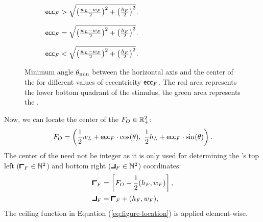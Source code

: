 \begin{figure}[!htp]
    \centering
    \begin{subfigure}[t]{0.3\textwidth}
        \centering
        
        \vspace{-1em}
        \caption{$\mathsf{ecc}_F > \sqrt{ \left( \frac{w_L - {w_F}}{2} \right)^2 + \left( \frac{{h_F}}{2} \right)^2 }$.}
        \label{fig:figangles-min1}
    \end{subfigure}
    \hspace{0.03\textwidth}
    \begin{subfigure}[t]{0.3\textwidth}
        \centering
        
        \vspace{-1em}
        \caption{$\mathsf{ecc}_F = \sqrt{ \left( \frac{w_L - {w_F}}{2} \right)^2 + \left( \frac{{h_F}}{2} \right)^2 }$.}
        \label{fig:figangles-min2}
    \end{subfigure}
    \hspace{0.03\textwidth}
    \begin{subfigure}[t]{0.3\textwidth}
        \centering
        
        \vspace{-1em}
        \caption{$\mathsf{ecc}_F < \sqrt{ \left( \frac{w_L - {w_F}}{2} \right)^2 + \left( \frac{{h_F}}{2} \right)^2 }$.}
        \label{fig:figangles-min3}
    \end{subfigure}
    \caption[Figure angle and eccentricity]{Minimum angle $\theta_{\min}$ between the horizontal axis and the center of the \stimfig{} for different values of eccentricity $\mathsf{ecc}_F$. The red area represents the lower bottom quadrant of the stimulus, the green area represents the \stimfig.}
    \label{fig:figangles-min}
\end{figure}

Now, we can locate the center of the \stimfig{} $F_O \in \mathbb{R}_+^2$:
\begin{equation}
    F_O = \left(
        \frac{1}{2} w_L + \mathsf{ecc}_F \cdot \cos(\theta), \
        \frac{1}{2} h_L + \mathsf{ecc}_F \cdot \sin(\theta)
    \right).
\end{equation}
The center of the \stimfig{} need not be integer as it is only used for determining the \stimfig{}'s top left ($\figstart \in \mathbb{N}^2$) and bottom right ($\figfinish \in \mathbb{N}^2$) coordinates:
\begin{align}
\begin{split}
    \figstart &= \ceil{\figcenter - \frac{1}{2} (\figheight, \figwidth)}, \\
    \figfinish &= \figstart + (\figheight, \figwidth),
\end{split}
\label{eq:figure-location}
\end{align}
The ceiling function in Equation (\ref{eq:figure-location}) is applied element-wise.